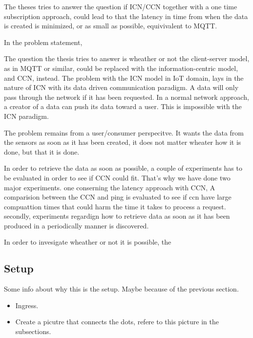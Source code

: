 The theses tries to answer the question if ICN/CCN together with a one time subscription approach, could lead to that the latency in time from when the data is created is minimized, or as small as possible, equivivalent to MQTT. 

In the problem statement, 

The question the thesis tries to answer is wheather or not the client-server model, as in MQTT or similar, could be replaced with the information-centric model, and CCN, instead. The problem with the ICN model in IoT domain, lays in the nature of ICN with its data driven communication paradigm. A data will only pass through the network if it has been requested. In a normal network approach, a creator of a data can push its data toward a user. This is impossible with the ICN paradigm. 

The problem remains from a user/consumer perspecitve. It wants the data from the sensors as soon as it has been created, it does not matter wheater how it is done, but that it is done. 

In order to retrieve the data as soon as possible, a couple of experiments has to be evaluated in order to see if CCN could fit. That's why we have done two major experiments. one conserning the latency approach with CCN, A comparision between the CCN and ping is evaluated to see if ccn have large compuattion times that could harm the time it takes to process a request. 
secondly, experiments regardign how to retrieve data as soon as it has been produced in a periodically manner is discovered.



In order to invesigate wheather or not it is possible, the




\subsection{Setup}

Some info about why this is the setup. Maybe because of the previous section.
\begin{itemize}
\item Ingress.
\item Create a picutre that connects the dots, refere to this picture in the subsections.
\end{itemize}








